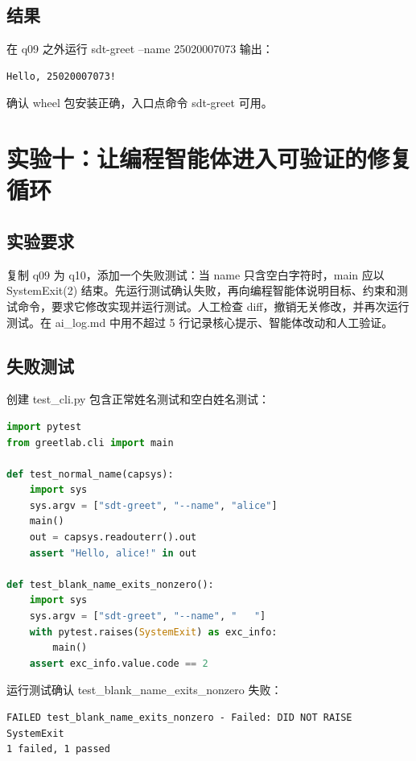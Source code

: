 \documentclass[UTF8]{ctexart}
\begin{document}
\subsection{结果}

在 q09 之外运行 sdt-greet --name 25020007073 输出：

\begin{lstlisting}
Hello, 25020007073!
\end{lstlisting}

确认 wheel 包安装正确，入口点命令 sdt-greet 可用。

\section{实验十：让编程智能体进入可验证的修复循环}

\subsection{实验要求}

复制 q09 为 q10，添加一个失败测试：当 name 只含空白字符时，main 应以 SystemExit(2) 结束。先运行测试确认失败，再向编程智能体说明目标、约束和测试命令，要求它修改实现并运行测试。人工检查 diff，撤销无关修改，并再次运行测试。在 ai\_log.md 中用不超过 5 行记录核心提示、智能体改动和人工验证。

\subsection{失败测试}

创建 test\_cli.py 包含正常姓名测试和空白姓名测试：

\begin{lstlisting}[language=Python]
import pytest
from greetlab.cli import main

def test_normal_name(capsys):
    import sys
    sys.argv = ["sdt-greet", "--name", "alice"]
    main()
    out = capsys.readouterr().out
    assert "Hello, alice!" in out

def test_blank_name_exits_nonzero():
    import sys
    sys.argv = ["sdt-greet", "--name", "   "]
    with pytest.raises(SystemExit) as exc_info:
        main()
    assert exc_info.value.code == 2
\end{lstlisting}

运行测试确认 test\_blank\_name\_exits\_nonzero 失败：

\begin{lstlisting}
FAILED test_blank_name_exits_nonzero - Failed: DID NOT RAISE SystemExit
1 failed, 1 passed
\end{lstlisting}
\end{document}
